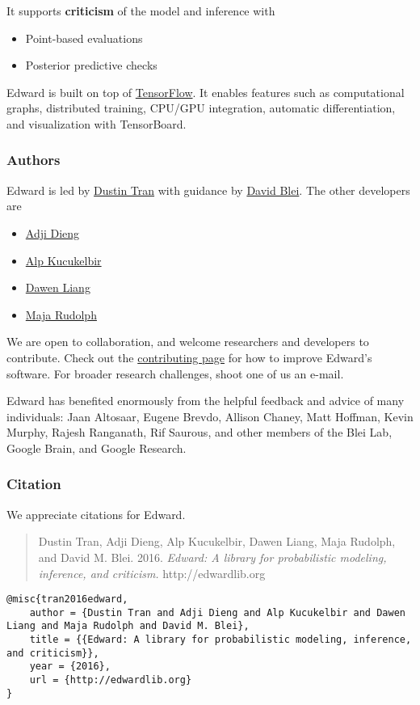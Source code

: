 It supports \textbf{criticism} of the model and inference with
\begin{itemize}
\item Point-based evaluations
\item Posterior predictive checks
\end{itemize}

Edward is built on top of
\href{https://www.tensorflow.org}{TensorFlow}. It enables features such
as computational graphs, distributed training, CPU/GPU integration,
automatic differentiation, and visualization with TensorBoard.

\subsubsection{Authors}

Edward is led by \href{http://dustintran.com}{Dustin Tran} with guidance
by \href{http://www.cs.columbia.edu/~blei/}{David Blei}. The other developers
are
\begin{itemize}
  \item \href{http://stat.columbia.edu/~diengadji/}{Adji Dieng}
  \item \href{http://www.proditus.com/}{Alp Kucukelbir}
  \item \href{http://www.ee.columbia.edu/~dliang/}{Dawen Liang}
  \item \href{http://maja-rita-rudolph.com/}{Maja Rudolph}
\end{itemize}
We are open to collaboration, and welcome
researchers and developers to contribute. Check out the
\href{contributing}{contributing page} for how to improve Edward's software.
For broader research challenges, shoot one of us an e-mail.

Edward has benefited enormously from the helpful feedback and advice
of many individuals: Jaan Altosaar, Eugene Brevdo, Allison Chaney, Matt
Hoffman, Kevin Murphy, Rajesh Ranganath, Rif Saurous, and other
members of the Blei Lab, Google Brain, and Google Research.

\subsubsection{Citation}

We appreciate citations for Edward.

\begin{quote}
Dustin Tran, Adji Dieng, Alp Kucukelbir, Dawen Liang, Maja Rudolph, and David M.
Blei. 2016.
\emph{Edward: A library for probabilistic modeling, inference, and criticism. }
http://edwardlib.org
\end{quote}

\begin{lstlisting}[class=JSON]
@misc{tran2016edward,
    author = {Dustin Tran and Adji Dieng and Alp Kucukelbir and Dawen Liang and Maja Rudolph and David M. Blei},
    title = {{Edward: A library for probabilistic modeling, inference, and criticism}},
    year = {2016},
    url = {http://edwardlib.org}
}
\end{lstlisting}
